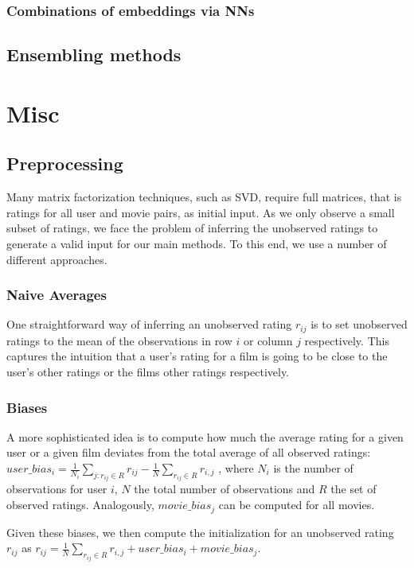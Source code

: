 \documentclass[10pt,conference,compsocconf]{IEEEtran}
\begin{document}
\subsubsection{Combinations of embeddings via NNs}

\subsection{Ensembling methods}


\section{Misc}

\subsection{Preprocessing}

Many matrix factorization techniques, such as SVD, require full matrices, that is ratings for all user and movie pairs, as initial input. As we only observe a small subset of ratings, we face the problem of inferring the unobserved ratings to generate a valid input for our main methods. To this end, we use a number of different approaches.

\subsubsection{Naive Averages}
One straightforward way of inferring an unobserved rating $r_{ij}$ is to set unobserved ratings to the mean of the observations in row $i$ or column $j$ respectively. This captures the intuition that a user's rating for a film is going to be close to the user's other ratings or the films other ratings respectively.

\subsubsection{Biases}
A more sophisticated idea is to compute how much the average rating for a given user or a given film deviates from the total average of all observed ratings: $user\_bias_i = \frac{1}{N_i} \sum_{j : r_{ij} \in R} r_{ij} - \frac{1}{N} \sum_{r_{ij} \in R} r_{i,j}$ , where $N_i$ is the number of observations for user $i$, $N$ the total number of observations and $R$ the set of observed ratings. Analogously, $movie\_bias_j$ can be computed for all movies. 

Given these biases, we then compute the initialization for an unobserved rating $r_{ij}$ as $r_{ij} = \frac{1}{N} \sum_{r_{ij} \in R} r_{i,j} + user\_bias_i + movie\_bias_j$.
\end{document}
